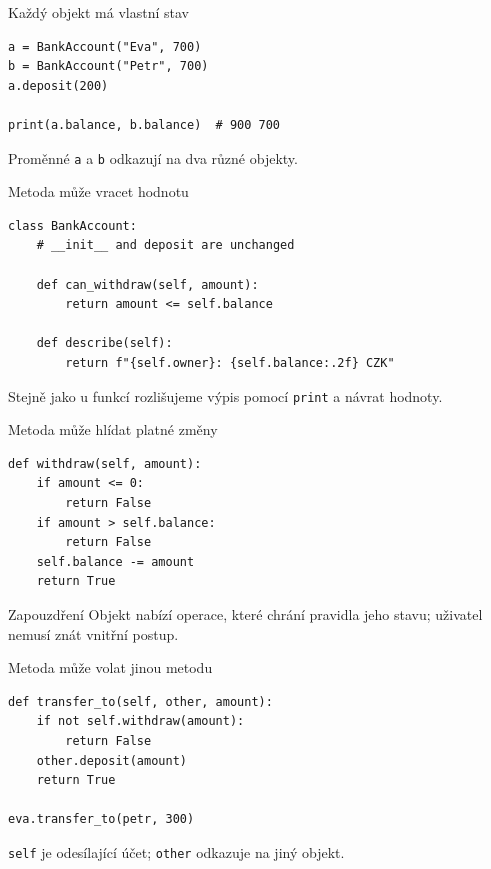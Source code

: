 \documentclass[aspectratio=169]{beamer}
\begin{document}
\begin{frame}[fragile]{Každý objekt má vlastní stav}
\begin{lstlisting}[style=python]
a = BankAccount("Eva", 700)
b = BankAccount("Petr", 700)
a.deposit(200)

print(a.balance, b.balance)  # 900 700
\end{lstlisting}
  Proměnné \texttt{a} a \texttt{b} odkazují na dva různé objekty.
\end{frame}

\begin{frame}[fragile]{Metoda může vracet hodnotu}
\begin{lstlisting}[style=python]
class BankAccount:
    # __init__ and deposit are unchanged

    def can_withdraw(self, amount):
        return amount <= self.balance

    def describe(self):
        return f"{self.owner}: {self.balance:.2f} CZK"
\end{lstlisting}
  Stejně jako u funkcí rozlišujeme výpis pomocí \texttt{print} a návrat hodnoty.
\end{frame}

\begin{frame}[fragile]{Metoda může hlídat platné změny}
\begin{lstlisting}[style=python,basicstyle=\ttfamily\small]
def withdraw(self, amount):
    if amount <= 0:
        return False
    if amount > self.balance:
        return False
    self.balance -= amount
    return True
\end{lstlisting}
  \begin{block}{Zapouzdření}
    Objekt nabízí operace, které chrání pravidla jeho stavu; uživatel nemusí znát vnitřní postup.
  \end{block}
\end{frame}

\begin{frame}[fragile]{Metoda může volat jinou metodu}
\begin{lstlisting}[style=python]
def transfer_to(self, other, amount):
    if not self.withdraw(amount):
        return False
    other.deposit(amount)
    return True

eva.transfer_to(petr, 300)
\end{lstlisting}
  \texttt{self} je odesílající účet; \texttt{other} odkazuje na jiný objekt.
\end{frame}
\end{document}

